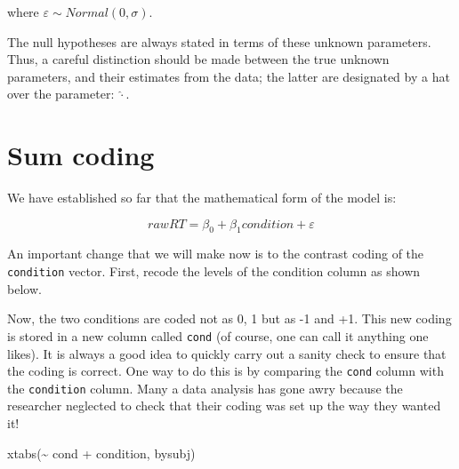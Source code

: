 \documentclass[
  12pt,
]{krantz}
\newenvironment{Shaded}{\begin{snugshade}}{\end{snugshade}}
\newcommand{\DecValTok}[1]{\textcolor[rgb]{0.00,0.00,0.81}{#1}}
\newcommand{\DocumentationTok}[1]{\textcolor[rgb]{0.56,0.35,0.01}{\textbf{\textit{#1}}}}
\newcommand{\FunctionTok}[1]{\textcolor[rgb]{0.00,0.00,0.00}{#1}}
\newcommand{\NormalTok}[1]{#1}
\newcommand{\OtherTok}[1]{\textcolor[rgb]{0.56,0.35,0.01}{#1}}
\newcommand{\SpecialCharTok}[1]{\textcolor[rgb]{0.00,0.00,0.00}{#1}}
\newcommand{\StringTok}[1]{\textcolor[rgb]{0.31,0.60,0.02}{#1}}
\theoremstyle{definition}
\theoremstyle{definition}
\theoremstyle{definition}
\theoremstyle{definition}
\theoremstyle{remark}
\begin{document}
where \(\varepsilon \sim Normal(0,\sigma)\).

The null hypotheses are always stated in terms of these unknown parameters. Thus, a careful distinction should be made between the true unknown parameters, and their estimates from the data; the latter are designated by a hat over the parameter: \(\hat\cdot\).

\hypertarget{sum-coding}{%
\section{Sum coding}\label{sum-coding}}

We have established so far that the mathematical form of the model is:

\begin{equation}
rawRT = \beta_0 + \beta_1 condition + \varepsilon
\end{equation}

An important change that we will make now is to the contrast coding of the \texttt{condition} vector. First, recode the levels of the condition column as shown below.

\begin{Shaded}
\end{Shaded}

Now, the two conditions are coded not as 0, 1 but as -1 and +1. This new coding is stored in a new column called \texttt{cond} (of course, one can call it anything one likes). It is always a good idea to quickly carry out a sanity check to ensure that the coding is correct. One way to do this is by comparing the \texttt{cond} column with the \texttt{condition} column. Many a data analysis has gone awry because the researcher neglected to check that their coding was set up the way they wanted it!

\begin{Shaded}
\begin{Highlighting}[]
\FunctionTok{xtabs}\NormalTok{(}\SpecialCharTok{\textasciitilde{}}\NormalTok{ cond }\SpecialCharTok{+}\NormalTok{ condition, bysubj)}
\end{Highlighting}
\end{Shaded}
\end{document}
